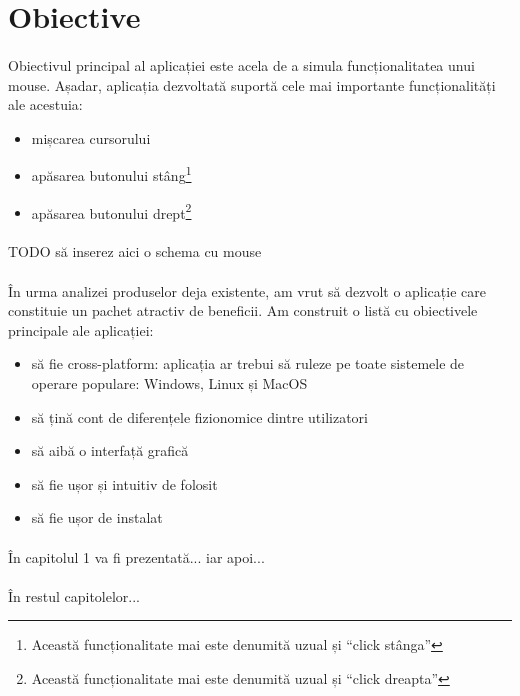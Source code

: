 \section*{Obiective}
\paragraph{}
Obiectivul principal al aplicației este acela de a simula funcționalitatea unui mouse.
Așadar, aplicația dezvoltată suportă cele mai importante funcționalități ale acestuia:
\begin{itemize}
    \item mișcarea cursorului
    \item apăsarea butonului stâng\footnote{Această funcționalitate mai este denumită uzual și ``click stânga''}
    \item apăsarea butonului drept\footnote{Această funcționalitate mai este denumită uzual și ``click dreapta''}
\end{itemize}

\paragraph{}
TODO să inserez aici o schema cu mouse

\paragraph{}
În urma analizei produselor deja existente, am vrut să dezvolt o aplicație care constituie un pachet atractiv de beneficii.
Am construit o listă cu obiectivele principale ale aplicației:
\begin{itemize}
    \item să fie cross-platform: aplicația ar trebui să ruleze pe toate sistemele de operare populare: Windows, Linux și MacOS
    \item să țină cont de diferențele fizionomice dintre utilizatori
    \item să aibă o interfață grafică
    \item să fie ușor și intuitiv de folosit
    \item să fie ușor de instalat
\end{itemize}

\paragraph{}
În capitolul 1 va fi prezentată... iar apoi...

\paragraph{}
În restul capitolelor...
